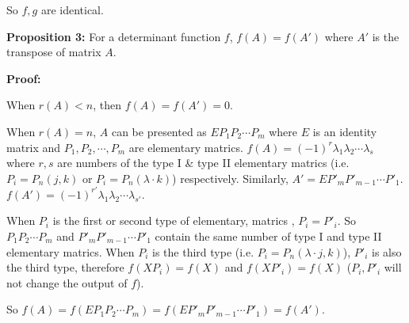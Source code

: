 \documentclass{article}
\begin{document}
So \(f, g\) are identical.

\vspace{2mm}
\textbf{Proposition 3:}
For a determinant function \(f\), \(f(A)=f(A')\) where \(A'\) is
the transpose of matrix \(A\).

\vspace{2mm}
\textbf{Proof:}

When \(r(A)<n\), then \(f(A)=f(A')=0\).

When \(r(A)=n\), \(A\) can be presented as \(EP_1P_2\cdots P_m\) where
\(E\) is an identity matrix and \(P_1, P_2, \cdots, P_m\) are elementary
matrics. \(f(A)=(-1)^r\lambda_1\lambda_2\cdots \lambda_s\) where \(r,s\)
are numbers of the type I \& type II elementary matrics (i.e. \(P_i=P_n(j,k)\) or
\(P_i=P_n(\lambda\cdot k)\)) respectively. 
Similarly, \(A'=EP'_mP'_{m-1}\cdots P'_1\). 
\(f(A')=(-1)^{r'}\lambda_1\lambda_2\cdots \lambda_{s'}\).

When \(P_i\) is the
first or second type of elementary, matrics , \(P_i=P'_i\). So \(P_1P_2\cdots P_m\)
and \(P'_mP'_{m-1}\cdots P'_1\) contain the same number of type I and type
II elementary matrics.
When \(P_i\) is the
third type (i.e. \(P_i=P_n(\lambda\cdot j, k)\)), \(P'_i\) is also the
third type, therefore \(f(XP_i)=f(X)\) and \(f(XP'_i)=f(X)\) (\(P_i,
P'_i\) will not change the output of \(f\)).

So \(f(A)=f(EP_1P_2\cdots P_m)=f(EP'_mP'_{m-1}\cdots P'_1)=f(A')\).
\end{document}

